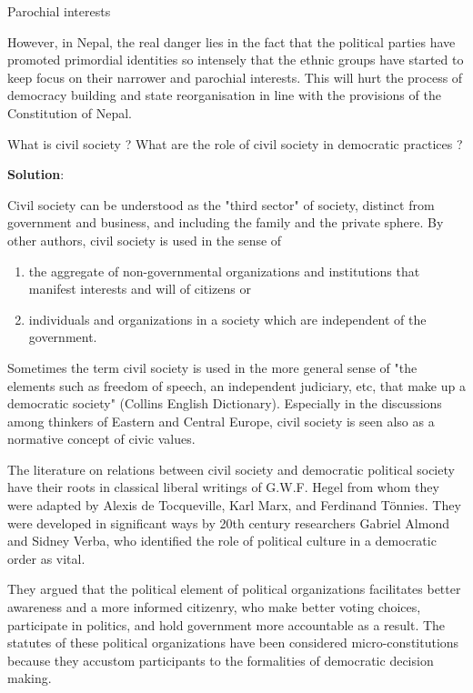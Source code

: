 \documentclass[
  openany]{book}
\newcommand{\question}{\item}
\newenvironment{solution}{ {\bfseries Solution}:}{}
\begin{document}
\begin{questions}
Parochial interests

However, in Nepal, the real danger lies in the fact that the political parties have promoted primordial identities so intensely that the ethnic groups have started to keep focus on their narrower and parochial interests. This will hurt the process of democracy building and state reorganisation in line with the provisions of the Constitution of Nepal.

\question What is civil society ? What are the role of civil society in democratic practices ?

\begin{solution}

Civil society can be understood as the "third sector" of society, distinct from government and business, and including the family and the private sphere. By other authors, civil society is used in the sense of 

\begin{enumerate}
\item the aggregate of non-governmental organizations and institutions that manifest interests and will of citizens or 
\item individuals and organizations in a society which are independent of the government.
\end{enumerate}

Sometimes the term civil society is used in the more general sense of "the elements such as freedom of speech, an independent judiciary, etc, that make up a democratic society" (Collins English Dictionary). Especially in the discussions among thinkers of Eastern and Central Europe, civil society is seen also as a normative concept of civic values.

The literature on relations between civil society and democratic political society have their roots in classical liberal writings of G.W.F. Hegel from whom they were adapted by Alexis de Tocqueville, Karl Marx, and Ferdinand Tönnies. They were developed in significant ways by 20th century researchers Gabriel Almond and Sidney Verba, who identified the role of political culture in a democratic order as vital.

They argued that the political element of political organizations facilitates better awareness and a more informed citizenry, who make better voting choices, participate in politics, and hold government more accountable as a result. The statutes of these political organizations have been considered micro-constitutions because they accustom participants to the formalities of democratic decision making.


\end{solution}
\end{questions}
\end{document}
